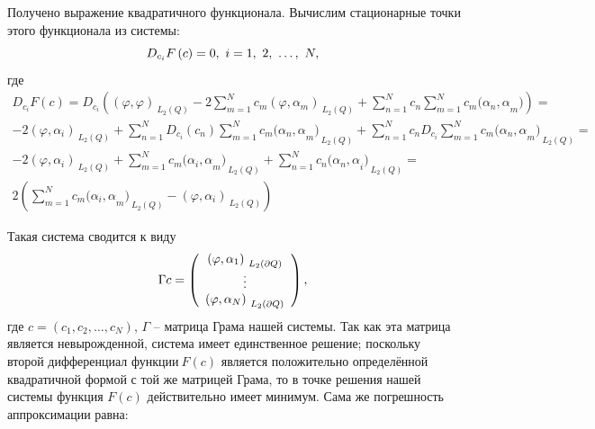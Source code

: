 ﻿\documentclass[a4paper, 12pt]{article}
\begin{document}
Получено выражение квадратичного функционала. Вычислим стационарные точки этого функционала из системы:
\begin{equation}D_{c_i}F\left(c\right)=0,\ i=1,\ 2,\ \dots ,\ N,\\\end{equation} 
где
\begin{multline}D_{c_i}F\left(c\right)=D_{c_i}\left({\left(\varphi,\varphi\right)}_{{\ L}_2\left(Q\right)}-2\sum^N_{m=1}{c_m}{\left(\varphi,\alpha_m\right)}_{{\ L}_2\left(Q\right)}+\sum^N_{n=1}{c_n}\sum^N_{m=1}{c_m}{(\alpha_n,\alpha}_m)\right)=\\
-2{\left(\varphi,\alpha_i\right)}_{{\ L}_2\left(Q\right)}+\sum^N_{n=1}{D_{c_i}\left(c_n\right)}\sum^N_{m=1}{c_m}{{(\alpha_n,\alpha}_m)}_{{\ L}_2\left(Q\right)}+\sum^N_{n=1}{c_n}D_{c_i}\sum^N_{m=1}{c_m}{{(\alpha_n,\alpha}_m)}_{{\ L}_2\left(Q\right)}=\\
-2{\left(\varphi,\alpha_i\right)}_{{\ L}_2\left(Q\right)}+\sum^N_{m=1}{c_m}{{(\alpha_i,\alpha}_m)}_{{\ L}_2\left(Q\right)}+\sum^N_{n=1}{c_n}{{(\alpha_n,\alpha}_i)}_{{\ L}_2\left(Q\right)}=\\
2\left(\sum^N_{m=1}{c_m}{{(\alpha_i,\alpha}_m)}_{{\ L}_2\left(Q\right)}-{\left(\varphi,\alpha_i\right)}_{{\ L}_2\left(Q\right)}\right)\end{multline} 

Такая система сводится к виду
\begin{equation}\Gamma c=\left( \begin{array}{c}
{\left(\varphi ,{\alpha }_1\right)}_{{\ L}_2\left(\partial Q\right)} \\ 
\vdots  \\ 
{\left(\varphi ,{\alpha }_N\right)}_{{\ L}_2\left(\partial Q\right)} \end{array}
\right),\\\end{equation} 
где $c=\left(c_1,c_2,\dots ,c_N\right)$, $\Gamma $ -- матрица Грама нашей системы. Так как эта матрица является невырожденной, система имеет единственное решение; поскольку второй дифференциал функции$\ F\left(c\right)$ является положительно определённой квадратичной формой с той же матрицей Грама, то в точке решения нашей системы функция $F\left(c\right)$ действительно имеет минимум. Сама же погрешность аппроксимации равна:
\end{document}
